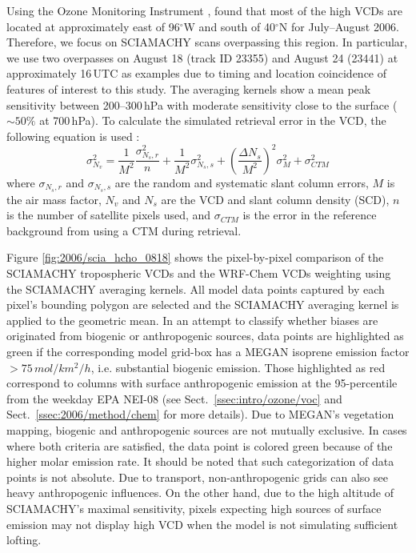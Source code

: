 Using the Ozone Monitoring Instrument \citep[OMI;][]{Levelt:2006kl}, \citet{Millet:2008oq} found that most of the high  VCDs are located at approximately east of
96$^\circ$W and south of 40$^\circ$N for July--August 2006. Therefore, we focus on SCIAMACHY scans overpassing this region. In particular, we use two overpasses
on August 18 (track ID 23355) and August 24 (23441) at approximately 16\,\unit{UTC} as examples due to timing and location coincidence of features of interest
to this study. The averaging kernels show a mean peak sensitivity between 200--300\,\unit{hPa} with moderate sensitivity close to the surface ($\sim50\%$ at 700\,\unit{hPa}).
To calculate the simulated retrieval error in the VCD, the following equation is used \citep[after][]{Boersma:2004uq,De-Smedt:2008uq}:
\begin{equation}\label{eqn:hcho_vcde}
	\sigma^2_{N_v} = \frac1{M^2}\frac{\sigma^2_{N_s,r}}{n}+\frac{1}{M^2}\sigma^2_{N_s,s}+\left(\frac{\Delta N_s}{M^2}\right)^2\sigma^2_M+\sigma^2_{CTM}
\end{equation}
where $\sigma_{N_s,r}$ and $\sigma_{N_s,s}$ are the random and systematic slant column errors, $M$ is the air mass factor, $N_v$ and $N_s$ are the VCD and slant column
density (SCD), $n$ is the number of satellite pixels used, and $\sigma_{CTM}$ is the error in the reference background from using a CTM during retrieval.

Figure \ref{fig:2006/scia_hcho_0818} shows the pixel-by-pixel comparison of the SCIAMACHY  tropospheric VCDs and the WRF-Chem  VCDs
weighting using the SCIAMACHY averaging kernels. All model data points captured by each pixel's bounding polygon are selected and the SCIAMACHY
averaging kernel is applied to the geometric mean. In an attempt to classify whether biases are originated from biogenic or anthropogenic sources, data
points are highlighted as green if the corresponding model grid-box has a MEGAN isoprene emission factor $>75\,\unit{mol/km^2/h}$, i.e. substantial biogenic emission. Those
highlighted as red correspond to columns with surface anthropogenic  emission at the 95-percentile from the weekday EPA NEI-08 (see
Sect.~\ref{ssec:intro/ozone/voc} and Sect.~\ref{ssec:2006/method/chem} for more details). Due to MEGAN's vegetation mapping, biogenic and anthropogenic sources are not
mutually exclusive. In cases where both criteria are satisfied, the data point is colored green because of the higher molar emission rate. It should be noted that such categorization of data points
is not absolute. Due to transport, non-anthropogenic grids can also see heavy anthropogenic influences. On the other hand, due to the high altitude of SCIAMACHY's maximal
sensitivity, pixels expecting high sources of surface emission may not display high VCD when the model is not simulating sufficient lofting.

